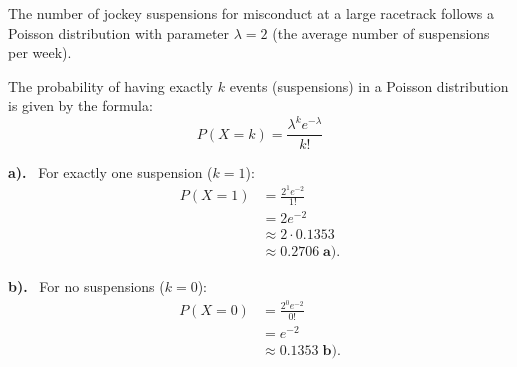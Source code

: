 \documentclass[a4paper, 10pt]{article}
\begin{document}
\begin{solution}
The number of jockey suspensions for misconduct at a large racetrack follows a Poisson distribution
with parameter \( \lambda = 2 \) (the average number of suspensions per week).

The probability of having exactly \( k \) events (suspensions) in a Poisson distribution is given by the formula:
\[
    P(X = k) = \frac{\lambda^k e^{-\lambda}}{k!}
\]

\par\noindent\textbf{a).} \, For exactly one suspension (\( k = 1 \)):
\begin{align*}
    P(X = 1) &= \frac{2^1 e^{-2}}{1!} \\
    &= 2 e^{-2} \\
    &\approx 2 \cdot 0.1353 \\
    &\approx \boxed{0.2706} \; \textbf{a).}
\end{align*}

\par\noindent\textbf{b).} \, For no suspensions (\( k = 0 \)):
\begin{align*}
    P(X = 0) &= \frac{2^0 e^{-2}}{0!} \\
    &= e^{-2} \\
    &\approx \boxed{0.1353} \; \textbf{b).}
\end{align*}
\end{solution}
\end{document}
